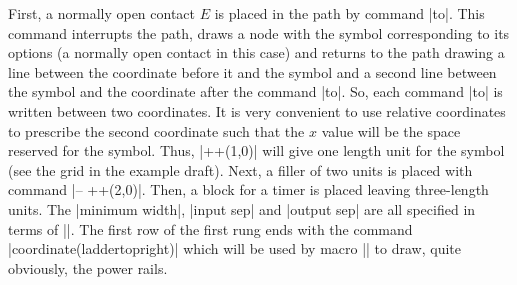 \documentclass[a4paper]{ltxdoc}
\begin{document}
\begin{codeexample}[width=7.7cm]
\end{codeexample}

\noindent{}First, a normally open contact $E$ is placed in the path by command |to|. This command interrupts the path, draws a node with the symbol corresponding to its options (a normally open contact in this case) and returns to the path drawing a line between the coordinate before it and the symbol and a second line between the symbol and the coordinate after the command |to|. So, each command |to| is written between two coordinates. It is very convenient to use relative coordinates to prescribe the second coordinate such that the $x$ value will be the space reserved for the symbol. Thus, |++(1,0)| will give one length unit for the symbol (see the grid in the example draft). Next, a filler of two units is placed with command |-- ++(2,0)|. Then, a block for a timer is placed leaving three-length units. The |minimum width|, |input sep| and |output sep| are all specified in terms of |\ladderskip|. The first row of the first rung ends with the command |coordinate(laddertopright)| which will be used by macro |\ladderpowerrails| to draw, quite obviously, the power rails.
\end{document}
